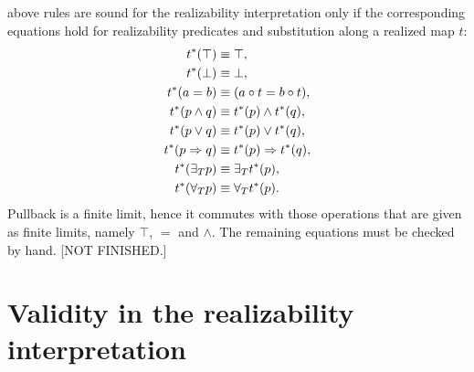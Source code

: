 above rules are sound for the realizability interpretation only if the
corresponding equations hold for realizability predicates and
substitution along a realized map $t$:
%
\begin{align*}
  t^{*}(\top) &\equiv \top,\\
  t^{*}(\bot) &\equiv \bot,\\
  t^{*}(a = b) &\equiv (a \circ t = b \circ t),\\
  t^{*}(p \land q) &\equiv t^{*}(p) \land t^{*}(q),\\
  t^{*}(p \lor q) &\equiv t^{*}(p) \lor t^{*}(q),\\
  t^{*}(p \Rightarrow q) &\equiv t^{*}(p) \Rightarrow t^{*}(q),\\
  t^{*}(\exists_{T} p) &\equiv \exists_{T} t^{*}(p),\\
  t^{*}(\forall_{T} p) &\equiv \forall_{T} t^{*}(p).
\end{align*}
%
Pullback is a finite limit, hence it commutes with those operations
that are given as finite limits, namely $\top$, $=$ and $\land$. The
remaining equations must be checked by hand. [NOT FINISHED.]


\section{Validity in the realizability interpretation}
\label{sec:realizability-validity}

